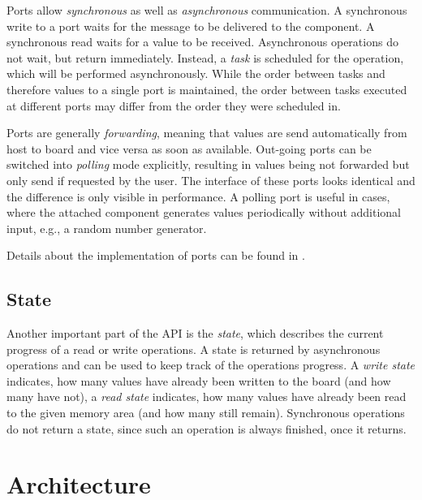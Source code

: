 \documentclass{report}
\begin{document}
Ports allow \textit{synchronous} as well as \textit{asynchronous} communication. A synchronous write to a port waits for the message to be delivered to the component. A synchronous read waits for a value to be received. Asynchronous operations do not wait, but return immediately. Instead, a \textit{task} is scheduled for the operation, which will be performed asynchronously. While the order between tasks and therefore values to a single port is maintained, the order between tasks executed at different ports may differ from the order they were scheduled in.

Ports are generally \textit{forwarding}, meaning that values are send automatically from host to board and vice versa as soon as available. Out-going ports can be switched into \textit{polling} mode explicitly, resulting in values being not forwarded but only send if requested by the user. The interface of these ports looks identical and the difference is only visible in performance. A polling port is useful in cases, where the attached component generates values periodically without additional input, e.g., a random number generator.

Details about the implementation of ports can be found in .

\subsection{State}
\label{sec:api:state}
Another important part of the API is the \textit{state}, which describes the current progress of a read or write operations. A state is returned by asynchronous operations and can be used to keep track of the operations progress. A \textit{write state} indicates, how many values have already been written to the board (and how many have not), a \textit{read state} indicates, how many values have already been read to the given memory area (and how many still remain).
Synchronous operations do not return a state, since such an operation is always finished, once it returns.

\section{Architecture}
\label{sec:arch}
\end{document}
